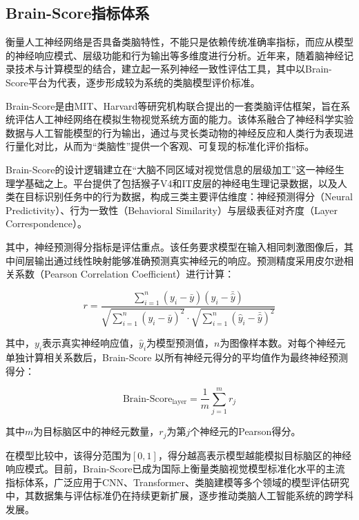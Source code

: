 \subsection{Brain-Score指标体系}

衡量人工神经网络是否具备类脑特性，不能只是依赖传统准确率指标，而应从模型的神经响应模式、层级功能和行为输出等多维度进行分析。近年来，随着脑神经记录技术与计算模型的结合，建立起一系列神经一致性评估工具，其中以Brain-Score平台为代表，逐步形成较为系统的类脑模型评价标准。

Brain-Score是由MIT、Harvard等研究机构联合提出的一套类脑评估框架，旨在系统评估人工神经网络在模拟生物视觉系统方面的能力。该体系融合了神经科学实验数据与人工智能模型的行为输出，通过与灵长类动物的神经反应和人类行为表现进行量化对比，从而为“类脑性”提供一个客观、可复现的标准化评价指标\cite{schrimpf2018brain}。

Brain-Score的设计逻辑建立在“大脑不同区域对视觉信息的层级加工”这一神经生理学基础之上。平台提供了包括猴子V4和IT皮层的神经电生理记录数据，以及人类在目标识别任务中的行为数据，构成三类主要评估维度：神经预测得分（Neural Predictivity）、行为一致性（Behavioral Similarity）与层级表征对齐度（Layer Correspondence）。

其中，神经预测得分指标是评估重点。该任务要求模型在输入相同刺激图像后，其中间层输出通过线性映射能够准确预测真实神经元的响应。预测精度采用皮尔逊相关系数（Pearson Correlation Coefficient）进行计算：

\begin{equation}
	r = 
	\frac{
		\sum_{i=1}^{n}(y_i - \bar{y})(\hat{y}_i - \bar{\hat{y}})
	}{
		\sqrt{\sum_{i=1}^{n}(y_i - \bar{y})^2} \cdot \sqrt{\sum_{i=1}^{n}(\hat{y}_i - \bar{\hat{y}})^2}
	}
	\label{eq:pearson}
\end{equation}

其中，$y_i$表示真实神经响应值，$\hat{y}_i$为模型预测值，$n$为图像样本数。对每个神经元单独计算相关系数后，Brain-Score 以所有神经元得分的平均值作为最终神经预测得分：

\begin{equation}
	\text{Brain-Score}_{\text{layer}} = \frac{1}{m} \sum_{j=1}^{m} r_j
	\label{eq:brain_score}
\end{equation}

其中$m$为目标脑区中的神经元数量，$r_j$为第$j$个神经元的Pearson得分。

在模型比较中，该得分范围为$[0, 1]$，得分越高表示模型越能模拟目标脑区的神经响应模式。目前，Brain-Score已成为国际上衡量类脑视觉模型标准化水平的主流指标体系，广泛应用于CNN、Transformer、类脑建模等多个领域的模型评估研究中，其数据集与评估标准仍在持续更新扩展，逐步推动类脑人工智能系统的跨学科发展。

